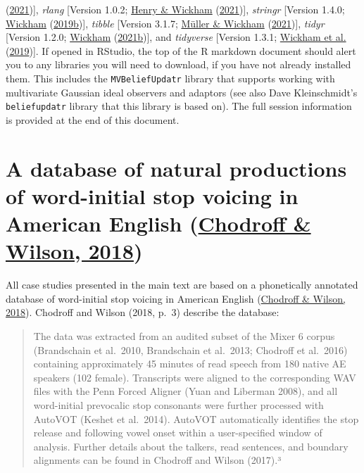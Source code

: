 \documentclass[
  11pt,
  english,
  man,floatsintext]{apa6}
\begin{document}
(\protect\hyperlink{ref-R-readr}{2021}){]}, \emph{rlang} {[}Version 1.0.2; \protect\hyperlink{ref-R-rlang}{Henry \& Wickham} (\protect\hyperlink{ref-R-rlang}{2021}){]}, \emph{stringr} {[}Version 1.4.0; \protect\hyperlink{ref-R-stringr}{Wickham} (\protect\hyperlink{ref-R-stringr}{2019b}){]}, \emph{tibble} {[}Version 3.1.7; \protect\hyperlink{ref-R-tibble}{Müller \& Wickham} (\protect\hyperlink{ref-R-tibble}{2021}){]}, \emph{tidyr} {[}Version 1.2.0; \protect\hyperlink{ref-R-tidyr}{Wickham} (\protect\hyperlink{ref-R-tidyr}{2021b}){]}, and \emph{tidyverse} {[}Version 1.3.1; \protect\hyperlink{ref-R-tidyverse}{Wickham et al.} (\protect\hyperlink{ref-R-tidyverse}{2019}){]}. If opened in RStudio, the top of the R markdown document should alert you to any libraries you will need to download, if you have not already installed them. This includes the \texttt{MVBeliefUpdatr} library that supports working with multivariate Gaussian ideal observers and adaptors (see also Dave Kleinschmidt's \texttt{beliefupdatr} library that this library is based on). The full session information is provided at the end of this document.

\hypertarget{sec:SI-chodroff}{%
\section{\texorpdfstring{A database of natural productions of word-initial stop voicing in American English (\protect\hyperlink{ref-chodroff-wilson2018}{Chodroff \& Wilson, 2018})}{A database of natural productions of word-initial stop voicing in American English (Chodroff \& Wilson, 2018)}}\label{sec:SI-chodroff}}

All case studies presented in the main text are based on a phonetically annotated database of word-initial stop voicing in American English (\protect\hyperlink{ref-chodroff-wilson2018}{Chodroff \& Wilson, 2018}). Chodroff and Wilson (2018, p.~3) describe the database:

\begin{quote}
The data was extracted from an audited subset of the Mixer 6 corpus (Brandschain et al.~2010, Brandschain
et al.~2013; Chodroff et al.~2016) containing approximately 45 minutes of read speech from 180 native AE
speakers (102 female). Transcripts were aligned to the corresponding WAV files with the Penn Forced Aligner
(Yuan and Liberman 2008), and all word-initial prevocalic stop consonants were further processed with
AutoVOT (Keshet et al.~2014). AutoVOT automatically identifies the stop release and following vowel onset
within a user-specified window of analysis. Further details about the talkers, read sentences, and boundary
alignments can be found in Chodroff and Wilson (2017).³
\end{quote}
\end{document}
